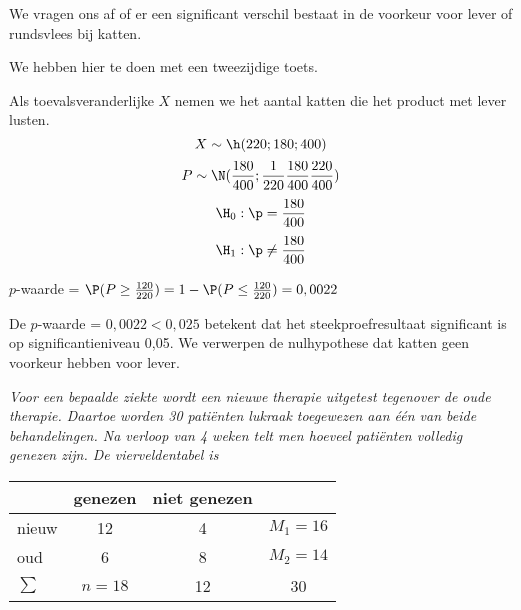 {\begin{itemize}
We vragen ons af of er een significant verschil bestaat in de voorkeur voor 
lever of rundsvlees bij katten.

We hebben hier te doen met een tweezijdige toets.

Als toevalsveranderlijke $X$ nemen we het aantal katten die het product 
met lever lusten.
$$X\sim\h(220;180;400)$$
$$P\sim\N(\frac{180}{400};\frac{1}{220}\frac{180}{400}\frac{220}{400})$$
$$\H_0: \p=\frac{180}{400}$$
$$\H_1: \p\not=\frac{180}{400}$$
 
$p$-waarde = $\P(P\geq \frac{120}{220})=1-\P(P\leq \frac{120}{220})=0,0022$

De $p$-waarde = $0,0022<0,025$ betekent dat het steekproefresultaat significant is
op 
significantieniveau 0,05. We verwerpen de nulhypothese dat katten geen voorkeur
hebben voor lever. 

\end{itemize}

{\footnotesize

\begin{Opgave}
\label{hypo6}
\em Voor een bepaalde ziekte wordt een nieuwe therapie uitgetest tegenover de 
oude 
therapie. 
Daartoe worden 30 pati\"enten lukraak toegewezen aan \'e\'en van beide 
behandelingen. Na verloop van 4 weken telt men hoeveel pati\"enten volledig 
genezen zijn. De vierveldentabel is

\begin{center}
\begin{tabular}{l|c|c|c}
  & genezen & niet genezen & \\
  \hline
nieuw & 12 & 4 & $M_1=16$\\
  \hline
  oud   & 6 & 8 & $M_2=14$\\
  \hline
$\sum$ & $n=18$ & 12 & 30
\end{tabular}
  \end{center}


\end{Opgave}}}
